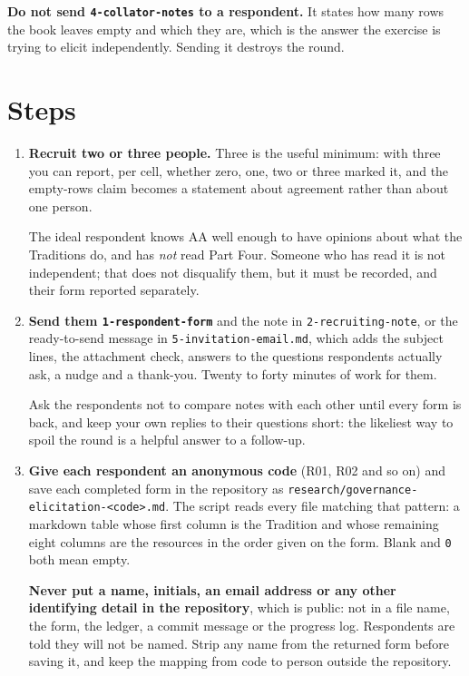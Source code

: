 \documentclass[11pt]{article}
\begin{document}
\begin{warning}
\textbf{Do not send \texttt{4-collator-notes} to a respondent.} It states how many rows the book
leaves empty and which they are, which is the answer the exercise is trying to elicit
independently. Sending it destroys the round.
\end{warning}

\section{Steps}

\begin{enumerate}[leftmargin=*,itemsep=6pt]
\item \textbf{Recruit two or three people.} Three is the useful minimum: with three you can
      report, per cell, whether zero, one, two or three marked it, and the empty-rows claim
      becomes a statement about agreement rather than about one person.

      The ideal respondent knows AA well enough to have opinions about what the Traditions do, and
      has \textit{not} read Part Four. Someone who has read it is not independent; that does not
      disqualify them, but it must be recorded, and their form reported separately.

\item \textbf{Send them \texttt{1-respondent-form}} and the note in \texttt{2-recruiting-note},
      or the ready-to-send message in \texttt{5-invitation-email.md}, which adds the subject
      lines, the attachment check, answers to the questions respondents actually ask, a nudge and
      a thank-you. Twenty to forty minutes of work for them.

      Ask the respondents not to compare notes with each other until every form is back, and keep
      your own replies to their questions short: the likeliest way to spoil the round is a helpful
      answer to a follow-up.

\item \textbf{Give each respondent an anonymous code} (R01, R02 and so on) and save each
      completed form in the repository as
      \texttt{research/governance-\allowbreak elicitation-<code>.md}. The script reads every file matching that pattern:
      a markdown table whose first column is the Tradition and whose remaining eight columns are
      the resources in the order given on the form. Blank and \texttt{0} both mean empty.

      \textbf{Never put a name, initials, an email address or any other identifying detail in
      the repository}, which is public: not in a file name, the form, the ledger, a commit message
      or the progress log. Respondents are told they will not be named. Strip any name from the
      returned form before saving it, and keep the mapping from code to person outside the
      repository.


\end{enumerate}
\end{document}
